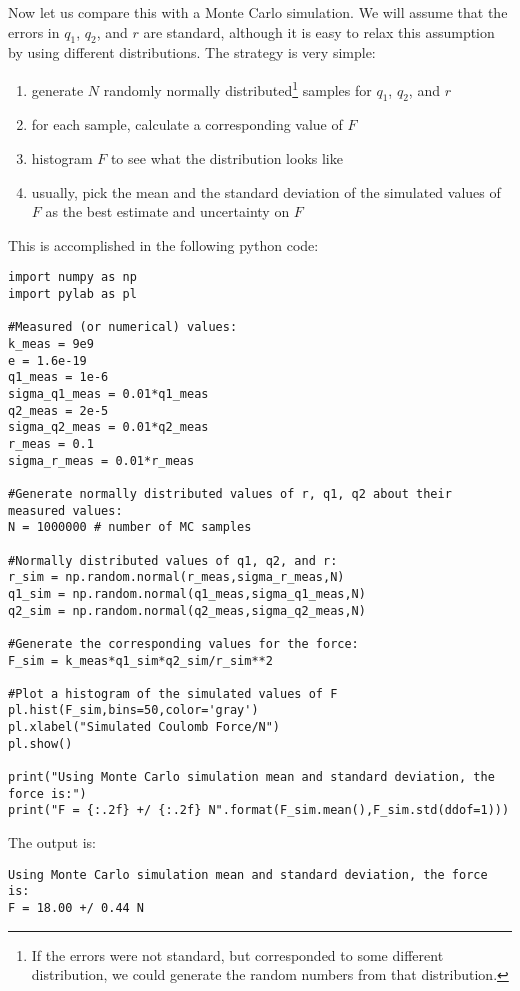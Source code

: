Now let us compare this with a Monte Carlo simulation. We will assume that the errors in $q_1$, $q_2$, and $r$ are standard, although it is easy to relax this assumption by using different distributions. The strategy is very simple:
\begin{enumerate}
\item generate $N$ randomly normally distributed\footnote{If the errors were not standard, but corresponded to some different distribution, we could generate the random numbers from that distribution.} samples for $q_1$, $q_2$, and $r$
\item for each sample, calculate a corresponding value of $F$
\item histogram $F$ to see what the distribution looks like
\item usually, pick the mean and the standard deviation of the simulated values of $F$ as the best estimate and uncertainty on $F$
\end{enumerate}
This is accomplished in the following python code:
\begin{lstlisting}[frame=single] 
import numpy as np
import pylab as pl

#Measured (or numerical) values:
k_meas = 9e9
e = 1.6e-19
q1_meas = 1e-6
sigma_q1_meas = 0.01*q1_meas
q2_meas = 2e-5
sigma_q2_meas = 0.01*q2_meas
r_meas = 0.1
sigma_r_meas = 0.01*r_meas

#Generate normally distributed values of r, q1, q2 about their measured values:
N = 1000000 # number of MC samples

#Normally distributed values of q1, q2, and r:
r_sim = np.random.normal(r_meas,sigma_r_meas,N)
q1_sim = np.random.normal(q1_meas,sigma_q1_meas,N)
q2_sim = np.random.normal(q2_meas,sigma_q2_meas,N)

#Generate the corresponding values for the force:
F_sim = k_meas*q1_sim*q2_sim/r_sim**2

#Plot a histogram of the simulated values of F
pl.hist(F_sim,bins=50,color='gray')
pl.xlabel("Simulated Coulomb Force/N")
pl.show()

print("Using Monte Carlo simulation mean and standard deviation, the force is:")
print("F = {:.2f} +/ {:.2f} N".format(F_sim.mean(),F_sim.std(ddof=1)))
\end{lstlisting}
The output is:
\begin{verbatim}
Using Monte Carlo simulation mean and standard deviation, the force is:
F = 18.00 +/ 0.44 N
\end{verbatim}

